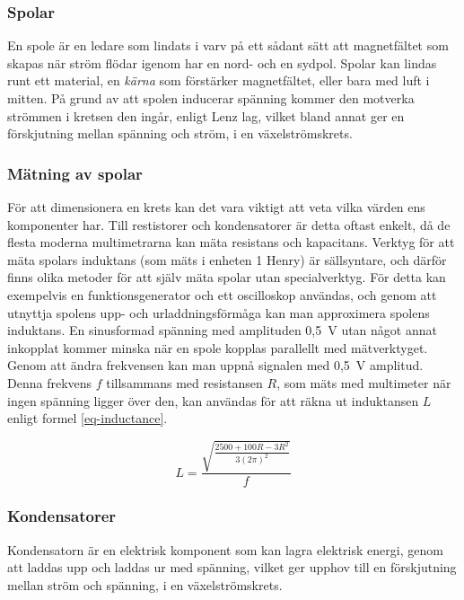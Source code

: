 \documentclass[a4paper]{article}
\begin{document}
\begin{sloppypar}
    \subsubsection{Spolar}
    En spole är en ledare som lindats i varv på ett sådant sätt att magnetfältet som skapas när ström flödar igenom har en nord- och en sydpol.
    Spolar kan lindas runt ett material, en \textit{kärna} som förstärker magnetfältet, eller bara med luft i mitten.
    På grund av att spolen inducerar spänning kommer den motverka strömmen i kretsen den ingår, enligt Lenz lag, vilket bland annat ger en förskjutning mellan spänning och ström, i en växelströmskrets.~\cite{digilar}
    \subsubsection{Mätning av spolar}
    För att dimensionera en krets kan det vara viktigt att veta vilka värden ens komponenter har.
    Till restistorer och kondensatorer är detta oftast enkelt, då de flesta moderna multimetrarna kan mäta resistans och kapacitans.
    Verktyg för att mäta spolars induktans (som mäts i enheten 1 Henry) är sällsyntare, och därför finns olika metoder för att själv mäta spolar utan specialverktyg.
    För detta kan exempelvis en funktionsgenerator och ett oscilloskop användas, och genom att utnyttja spolens upp- och urladdningsförmåga kan man approximera spolens induktans.
    En sinusformad spänning med amplituden 0,5~V utan något annat inkopplat kommer minska när en spole kopplas parallellt med mätverktyget. Genom att ändra frekvensen kan man uppnå signalen med 0,5~V amplitud. Denna frekvens $f$ tillsammans med resistansen $R$, som mäts med multimeter när ingen spänning ligger över den, kan användas för att räkna ut induktansen $L$ enligt formel \ref{eq-inductance}.~\cite{MeasureInductor}

    \begin{equation}
        \label{eq-inductance}
        L = \frac{\sqrt{\frac{2500+100R-3R^2}{3(2\pi)^2}}}{f}
    \end{equation}


    \subsubsection{Kondensatorer}
    Kondensatorn är en elektrisk komponent som kan lagra elektrisk energi, genom att laddas upp och laddas ur med spänning, vilket ger upphov till en förskjutning mellan ström och spänning, i en växelströmskrets.~\cite{digilar}


\end{sloppypar}
\end{document}
